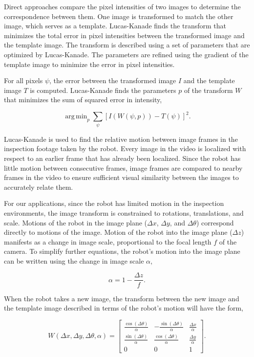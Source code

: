 \documentclass[letterpaper, 10 pt, conference]{ieeeconf}
\DeclareMathOperator*{\argmin}{arg\,min}
\begin{document}
Direct approaches compare the pixel intensities of two images to determine the correspondence between them. One image is transformed to match the other image, which serves as a template. Lucas-Kanade finds the transform that minimizes the total error in pixel intensities between the transformed image and the template image. The transform is described using a set of parameters that are optimized by Lucas-Kanade. The parameters are refined using the gradient of the template image to minimize the error in pixel intensities. 

For all pixels $\psi$, the error between the transformed image $I$ and the template image $T$ is computed. Lucas-Kanade finds the parameters $p$ of the transform $W$ that minimizes the sum of squared error in intensity, 

\begin{equation} \label{eq:lkt_min}
    \argmin_p \sum_{\psi} [I(W(\psi, p)) - T(\psi)]^2.
\end{equation}

Lucas-Kanade is used to find the relative motion between image frames in the inspection footage taken by the robot. Every image in the video is localized with respect to an earlier frame that has already been localized. Since the robot has little motion between consecutive frames, image frames are compared to nearby frames in the video to ensure sufficient visual similarity between the images to accurately relate them.

For our applications, since the robot has limited motion in the inspection environments, the image transform is constrained to rotations, translations, and scale. Motions of the robot in the image plane ($\Delta x$, $\Delta y$, and $\Delta \theta$) correspond directly to motions of the image. Motion of the robot into the image plane ($\Delta z$) manifests as a change in image scale, proportional to the focal length $f$ of the camera. To simplify further equations, the robot's motion into the image plane can be written using the change in image scale $\alpha$,

\begin{equation} \label{eq:z_motion_conversion}
	\alpha = 1 - \frac{\Delta z}{f}.
\end{equation}

When the robot takes a new image, the transform between the new image and the template image described in terms of the robot's motion will have the form,

\begin{equation*}
W(\Delta x, \Delta y, \Delta \theta, \alpha) = \begin{bmatrix} \frac{\cos(\Delta \theta)}{\alpha} & -\frac{\sin(\Delta \theta)}{\alpha} & \frac{\Delta x}{\alpha} \\ \frac{\sin(\Delta \theta)}{\alpha} & \frac{\cos(\Delta \theta)}{\alpha} & \frac{\Delta y}{\alpha} \\ 0 & 0 & 1 \end{bmatrix}.
\end{equation*}
\end{document}
